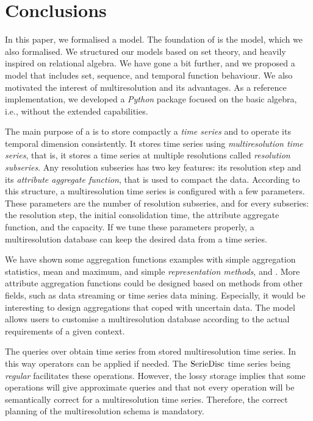 \section{Conclusions}
\label{sec:concl-future-work}

In this paper, we formalised a  model. The foundation of
 is the  model, which we also formalised.  We
structured our models based on set theory, and heavily inspired on
relational algebra. We have gone a bit further, and we proposed a
 model that includes set, sequence, and temporal function
behaviour. We also motivated the interest of multiresolution and its
advantages.  As a reference implementation, we developed a
\emph{Python} package focused on the basic algebra, i.e., without the
extended  capabilities.


The main purpose of a  is to store compactly a \emph{time
  series} and to operate its temporal dimension consistently.  It
stores time series using \emph{multiresolution time series}, that is,
it stores a time series at multiple resolutions called
\emph{resolution subseries}. Any resolution subseries has two key
features: its resolution step and its \emph{attribute aggregate
  function}, that is used to compact the data. According to this
structure, a multiresolution time series is configured with a few
parameters. These parameters are the number of resolution subseries,
and for every subseries: the resolution step, the initial
consolidation time, the attribute aggregate function, and the
capacity.  If we tune these parameters properly, a multiresolution
database can keep the desired data from a time series.


We have shown some aggregation functions examples with simple
aggregation statistics, mean and maximum, and simple
\emph{representation methods}, \dd{} and \zohe{}. More attribute
aggregation functions could be designed based on methods from other
fields, such as data streaming or time series data mining. Especially,
it would be interesting to design aggregations that coped with
uncertain data.  The model allows users to customise a multiresolution
database according to the actual requirements of a given context.


The queries over  obtain time series from stored
multiresolution time series. In this way  operators can be
applied if needed. The $\operatorname{SerieDisc}$ time series being \emph{regular}
facilitates these operations. However, the lossy storage implies that
some operations will give approximate queries and that not
every  operation will be semantically correct for a
multiresolution time series. Therefore, the correct planning of the
multiresolution schema is mandatory.


